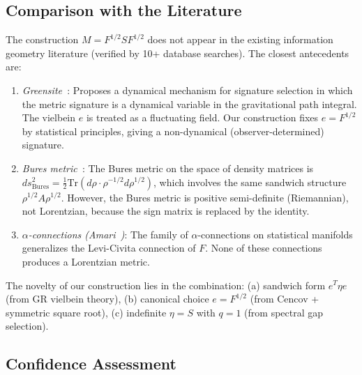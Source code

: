 \documentclass[11pt]{article}
\theoremstyle{definition}
\theoremstyle{remark}
\newcommand{\Fish}{F}
\newcommand{\sgn}{S}
\newcommand{\Met}{M}
\begin{document}
\subsection{Comparison with the Literature}
\label{subsec:vielbein-literature}

The construction $\Met = \Fish^{1/2}\sgn\Fish^{1/2}$ does not appear
in the existing information geometry literature (verified by 10+
database searches). The closest antecedents are:

\begin{enumerate}
\item \textit{Greensite~\cite{Greensite1993}}: Proposes a dynamical
  mechanism for signature selection in which the metric signature is
  a dynamical variable in the gravitational path integral. The vielbein
  $e$ is treated as a fluctuating field. Our construction fixes $e = \Fish^{1/2}$
  by statistical principles, giving a non-dynamical (observer-determined)
  signature.

\item \textit{Bures metric~\cite{Uhlmann1976}}: The Bures metric on the
  space of density matrices is $ds^2_{\mathrm{Bures}} = \tfrac{1}{2}
  \mathrm{Tr}(d\rho \cdot \rho^{-1/2} d\rho^{1/2})$, which involves
  the same sandwich structure $\rho^{1/2} A \rho^{1/2}$. However, the
  Bures metric is positive semi-definite (Riemannian), not Lorentzian,
  because the sign matrix is replaced by the identity.

\item \textit{$\alpha$-connections (Amari~\cite{Amari1998})}: The family
  of $\alpha$-connections on statistical manifolds generalizes the Levi-Civita
  connection of $\Fish$. None of these connections produces a Lorentzian
  metric.
\end{enumerate}

The novelty of our construction lies in the combination:
(a) sandwich form $e^T \eta e$ (from GR vielbein theory),
(b) canonical choice $e = \Fish^{1/2}$ (from Cencov + symmetric square root),
(c) indefinite $\eta = \sgn$ with $q = 1$ (from spectral gap selection).

\subsection{Confidence Assessment}
\label{subsec:vielbein-confidence}
\end{document}
